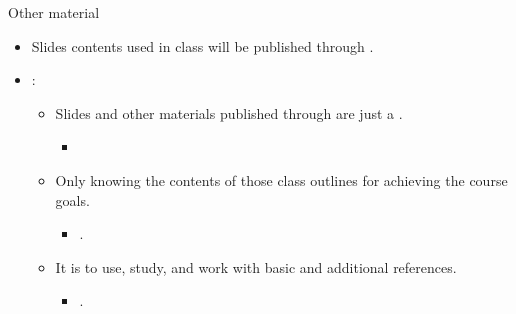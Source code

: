 \begin{frame}[t]{Other material}
\begin{itemize}
  \item Slides contents used in class will be published through .

  \item {}:
    \begin{itemize}
      \item Slides and other materials published through  
            are just a .
        \begin{itemize}
          \item {}
        \end{itemize}
      \item Only knowing the contents of those class outlines  
            for achieving the course goals.
        \begin{itemize}
          \item {}.
        \end{itemize}
      \item It is  to use, study, and work 
            with basic and additional references.
        \begin{itemize}
          \item {}.
        \end{itemize}
    \end{itemize}
\end{itemize}
\end{frame}

